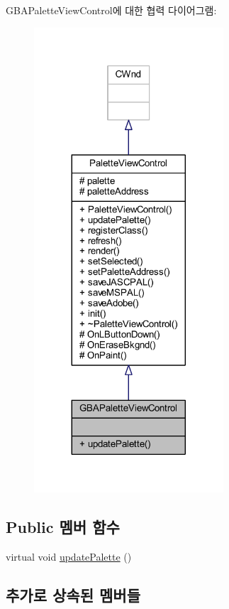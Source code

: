 G\+B\+A\+Palette\+View\+Control에 대한 협력 다이어그램\+:\nopagebreak
\begin{figure}[H]
\begin{center}
\leavevmode
\includegraphics[width=200pt]{class_g_b_a_palette_view_control__coll__graph}
\end{center}
\end{figure}
\subsection*{Public 멤버 함수}
\begin{DoxyCompactItemize}
\item 
virtual void \mbox{\hyperlink{class_g_b_a_palette_view_control_a020d7db2f3efb69b4e08d1b5fb351850}{update\+Palette}} ()
\end{DoxyCompactItemize}
\subsection*{추가로 상속된 멤버들}


